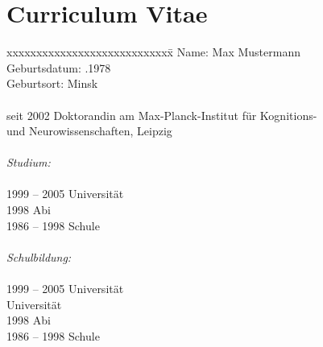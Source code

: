 \chapter*{Curriculum Vitae}

\begin{tabbing}
xxxxxxxxxxxxxxxxxxxxxxxxxxxx\=\kill
Name: \> Max Mustermann\\
Geburtsdatum: .1978\\
Geburtsort: \> Minsk\\\\

seit 2002 \> Doktorandin am Max-Planck-Institut für Kognitions-\\
                \> und Neurowissenschaften, Leipzig\\\\


\textit{Studium:}\\\\
1999 -- 2005 \> Universität\\
1998         \> Abi\\
1986 -- 1998 \> Schule\\\\


\textit{Schulbildung:}\\\\
1999 -- 2005 \> Universität\\
             \> Universität\\
1998         \> Abi\\
1986 -- 1998 \> Schule

\end{tabbing}
